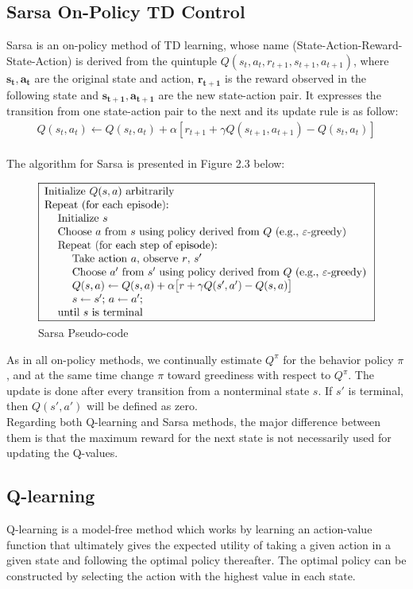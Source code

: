 \documentclass[paper=a4, fontsize=11pt]{scrartcl}
\numberwithin{equation}{section}		%
\numberwithin{figure}{section}			%
\numberwithin{table}{section}				%
\begin{document}
\subsection*{Sarsa On-Policy TD Control}
Sarsa is an on-policy method of TD learning, whose name (State-Action-Reward-State-Action) is derived from the quintuple $Q(s_t, a_t, r_{t+1}, s_{t+1}, a_{t+1})$, where  $\mathbf{s_t, a_t}$ are the original state and action, $\mathbf{r_{t+1}}$ is the reward observed in the following state and $\mathbf{s_{t+1}, a_{t+1}}$ are the new state-action pair. It expresses the transition from one state-action pair to the next and its update rule is as follow:
\begin{align}
Q(s_t, a_t) \gets Q(s_t, a_t)+\alpha[r_{t+1}+\gamma Q(s_{t+1}, a_{t+1})-Q(s_t, a_t)]
\end{align}\\
The algorithm for Sarsa is presented in Figure 2.3 below:
\begin{figure}[H] \centering
\includegraphics[scale=0.6]{sarsa_algorithm.png}
\caption{Sarsa Pseudo-code} \label{figure:Sarsa}
\end{figure}
As in all on-policy methods, we continually estimate $Q^\pi$ for the behavior policy $\pi$, and at the same time change $\pi$ toward greediness with respect to $Q^\pi$. The update is done after every transition from a nonterminal state $s$. If $s'$ is terminal, then $Q(s',a')$ will be defined as zero. \\
Regarding both Q-learning and Sarsa methods, the major difference between them is that the maximum reward for the next state is not necessarily used for updating the Q-values.

\subsection{\textbf {Q-learning}}
Q-learning is a model-free method which works by learning an action-value function that ultimately gives the expected utility of taking a given action in a given state and following the optimal policy thereafter.  The optimal policy can be constructed by selecting the action with the highest value in each state.
\end{document}

